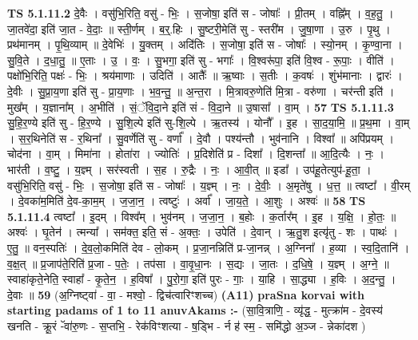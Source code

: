 \documentclass[17pt]{extarticle}
\begin{document}
                  \newline
                                \textbf{ TS 5.1.11.2} \newline
                  दे॒वैः । वसु॑भि॒रिति॒ वसु॑ - भिः॒ । स॒जोषा॒ इति॑ स - जोषाः᳚ । प्री॒तम् । वह्नि᳚म् । व॒ह॒तु॒ । जा॒तवे॑दा॒ इति॑ जा॒त - वे॒दाः॒ ॥ स्ती॒र्णम् । ब॒र्॒.हिः । सु॒ष्टरी॒मेति॑ सु - स्तरी॑म । जु॒षा॒णा । उ॒रु । पृ॒थु । प्रथ॑मानम् । पृ॒थि॒व्याम् ॥ दे॒वेभिः॑ । यु॒क्तम् । अदि॑तिः । स॒जोषा॒ इति॑ स - जोषाः᳚ । स्यो॒नम् । कृ॒ण्वा॒ना । सु॒वि॒ते । द॒धा॒तु॒ ॥ ए॒ताः । उ॒ । वः॒ । सु॒भगा॒ इति॑ सु - भगाः᳚ । वि॒श्वरू॑पा॒ इति॑ वि॒श्व - रू॒पाः॒ । वीति॑ । पक्षो॑भि॒रिति॒ पक्षः॑ - भिः॒ । श्रय॑माणाः । उदिति॑ । आतैः᳚ ॥ ऋ॒ष्वाः । स॒तीः । क॒वषः॑ । शुंभ॑मानाः । द्वारः॑ । दे॒वीः । सु॒प्रा॒य॒णा इति॑ सु - प्रा॒य॒णाः । भ॒व॒न्तु॒ ॥ अ॒न्त॒रा । मि॒त्रावरु॒णेति॑ मि॒त्रा - वरु॑णा । चर॑न्ती इति॑ । मुख᳚म् । य॒ज्ञाना᳚म् । अ॒भीति॑ । सं॒ॅवि॒दा॒ने इति॑ सं - वि॒दा॒ने ॥ उ॒षासा᳚ । वा॒म् । \textbf{  57} \newline
                  \newline
                                \textbf{ TS 5.1.11.3} \newline
                  सु॒हि॒र॒ण्ये इति॑ सु - हि॒र॒ण्ये । सु॒शि॒ल्पे इति॑ सु-शि॒ल्पे । ऋ॒तस्य॑ । योनौ᳚ । इ॒ह । सा॒द॒या॒मि॒ ॥ प्र॒थ॒मा । वा॒म् । स॒र॒थिनेति॑ स - र॒थिना᳚ । सु॒वर्णेति॑ सु - वर्णा᳚ । दे॒वौ । पश्य॑न्तौ । भुव॑नानि । विश्वा᳚ ॥ अपि॑प्रयम् । चोद॑ना । वा॒म् । मिमा॑ना । होता॑रा । ज्योतिः॑ । प्र॒दिशेति॑ प्र - दिशा᳚ । दि॒शन्ता᳚ ॥ आ॒दि॒त्यैः । नः॒ । भार॑ती । व॒ष्टु॒ । य॒ज्ञ्म् । सर॑स्वती । स॒ह । रु॒द्रैः । नः॒ । आ॒वी॒त् ॥ इडा᳚ । उप॑हू॒तेत्युप॑-हू॒ता॒ । वसु॑भि॒रिति॒ वसु॑ - भिः॒ । स॒जोषा॒ इति॑ स - जोषाः᳚ । य॒ज्ञ्म् । नः॒ । दे॒वीः॒ । अ॒मृते॑षु । ध॒त्त॒ ॥ त्वष्टा᳚ । वी॒रम् । दे॒वका॑म॒मिति॑ दे॒व-का॒म॒म् । ज॒जा॒न॒ । त्वष्टुः॑ । अर्वा᳚ । जा॒य॒ते॒ । आ॒शुः । अश्वः॑ ॥ \textbf{  58} \newline
                  \newline
                                \textbf{ TS 5.1.11.4} \newline
                  त्वष्टा᳚ । इ॒दम् । विश्व᳚म् । भुव॑नम् । ज॒जा॒न॒ । ब॒होः । क॒र्तार᳚म् । इ॒ह । य॒क्षि॒ । हो॒तः॒ ॥ अश्वः॑ । घृ॒तेन॑ । त्मन्या᳚ । सम॑क्त॒ इति॒ सं - अ॒क्तः॒ । उपेति॑ । दे॒वान् । ऋ॒तु॒श इत्यृ॑तु - शः । पाथः॑ । ए॒तु॒ ॥ वन॒स्पतिः॑ । दे॒व॒लो॒कमिति॑ देव - लो॒कम् । प्र॒जा॒नन्निति॑ प्र-जा॒नन्न् । अ॒ग्निना᳚ । ह॒व्या । स्व॒दि॒तानि॑ । व॒क्ष॒त् ॥ प्र॒जाप॑ते॒रिति॑ प्र॒जा - प॒तेः॒ । तप॑सा । वा॒वृ॒धा॒नः । स॒द्यः । जा॒तः । द॒धि॒षे॒ । य॒ज्ञ्म् । अ॒ग्ने॒ ॥ स्वाहा॑कृते॒नेति॒ स्वाहा᳚ - कृ॒ते॒न॒ । ह॒विषा᳚ । पु॒रो॒गा॒ इति॑ पुरः - गाः॒ । या॒हि । सा॒द्ध्या । ह॒विः । अ॒द॒न्तु॒ । दे॒वाः ॥ \textbf{  59} \newline
                  \newline
                      (अ॒ग्निष्ट्वा॑ - वा॒ - मश्वो॒ - द्विच॑त्वारिꣳशच्च)  \textbf{(A11)} \newline \newline
\textbf{praSna korvai with starting padams of 1 to 11 anuvAkams :-} \newline
(सा॒वि॒त्राणि॒ - व्यृ॑द्ध॒ - मुत्क्रा॑म - दे॒वस्य॑ खनति - क्रू॒रं -ॅवा॑रु॒णः - स॒प्तभि॒ - रेक॑विꣳशत्या - ष॒ड्भि - र्न ह॑ स्म॒ - समि॑द्धो अ॒ञ्ज - न्नेका॑दश ) \newline
\end{document}
